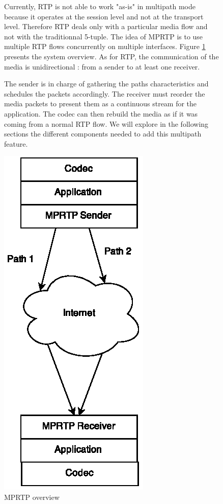 \begin{figure}[!ht]

\begin{minipage}[c]{0.55\linewidth}

Currently, RTP is not able to work "as-is" in multipath mode because it operates at the session level and not at the transport level. Therefore RTP deals only with a particular media flow and not with the traditionnal 5-tuple. The idea of MPRTP is to use multiple RTP flows concurrently on multiple interfaces. Figure \ref{fig:mprtp-concept} presents the system overview. As for RTP, the communication of the media is unidirectional : from a sender to at least one receiver.

\vspace{10pt}

The sender is in charge of gathering the paths characteristics and schedules the packets accordingly. The receiver must reorder the media packets to present them as a continuous stream for the application. The codec can then rebuild the media as if it was coming from a normal RTP flow. We will explore in the following sections the different components needed to add this multipath feature.

\end{minipage}
\begin{minipage}{0.44\linewidth}
\centering

\includegraphics{images/mprtp-overview}
\caption[MPRTP overview]{MPRTP overview}
\label{fig:mprtp-concept}

\end{minipage}

\end{figure}

